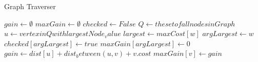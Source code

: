 \begin{algorithm}[ht]
\caption{Graph Traverser}
\label{fig:walkpath}
\begin{algorithmic}[1]
{\footnotesize
{}
	\State $gain \gets \emptyset$
	\State $maxGain \gets \emptyset$	 
	\State $checked  \gets False$ 
	\State $Q \gets the set of all nodes in Graph$			
		\State $u  \gets  vertex in Q with largest Node_value$ 
		\State $largest \gets maxCost[w]$
		\State $argLargest \gets w$
		\EndIf 
		\State  $checked[argLargest] \gets true$
		\State  $maxGain[argLargest] \gets 0$		
		\State $gain \gets dist[u] + dist_between(u, v)+ v.cost $
		\State $maxGain[v] \gets gain$
		\EndIf
		\EndFor
		\EndWhile
\EndProcedure
}
\end{algorithmic}
\end{algorithm}





